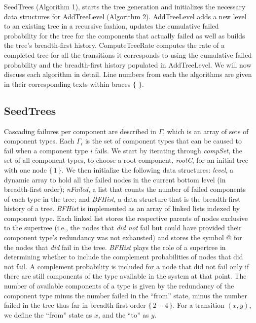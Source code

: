 \documentclass[12pt]{article}
\newcommand{\citeLine}[1]{$\{\,#1\,\}$}
\newcommand{\citeBlock}[2]{$\{\,#1 - #2\,\}$}
\begin{document}
SeedTrees (Algorithm 1), starts the tree generation and initializes the necessary data structures for AddTreeLevel (Algorithm 2). AddTreeLevel adds a new level to an existing tree in a recursive fashion, updates the cumulative failed probability for the tree for the components that actually failed as well as builds the tree's breadth-first history. ComputeTreeRate computes the rate of a completed tree for all the transitions it corresponds to using the cumulative failed probability and the breadth-first history populated in AddTreeLevel. We will now discuss each algorithm in detail. Line numbers from each the algorithms are given in their corresponding texts within braces \citeLine{}.

\subsection{SeedTrees}

Cascading failures per component are described in $\Gamma$, which is an array of sets of component types. Each $\Gamma_i$ is the set of component types that can be caused to fail when a component type $i$ fails. We start by iterating through \textit{compSet}, the set of all component types, to choose a root component, \textit{rootC}, for an initial tree with one node \citeLine{1}. We then initialize the following data structures: \textit{level}, a dynamic array to hold all the failed nodes in the current bottom level (in breadth-first order); \textit{nFailed}, a list that counts the number of failed components of each type in the tree; and \textit{BFHist}, a data structure that is the breadth-first history of a tree. \textit{BFHist} is implemented as an array of linked lists indexed by component type. Each linked list stores the respective parents of nodes exclusive to the supertree (i.e., the nodes that \textit{did not} fail but could have provided their component type's redundancy was not exhausted) and stores the symbol @ for the nodes that \textit{did} fail in the tree. \textit{BFHist} plays the role of a supertree in determining whether to include the complement probabilities of nodes that did not fail. A complement probability is included for a node that did not fail only if there are still components of the type available in the system at that point. The number of available components of a type is given by the redundancy of the component type minus the number failed in the ``from'' state, minus the number failed in the tree thus far in breadth-first order \citeBlock{2}{4}. For a transition $(x,y)$, we define the ``from'' state as $x$, and the ``to'' as $y$.
\end{document}
